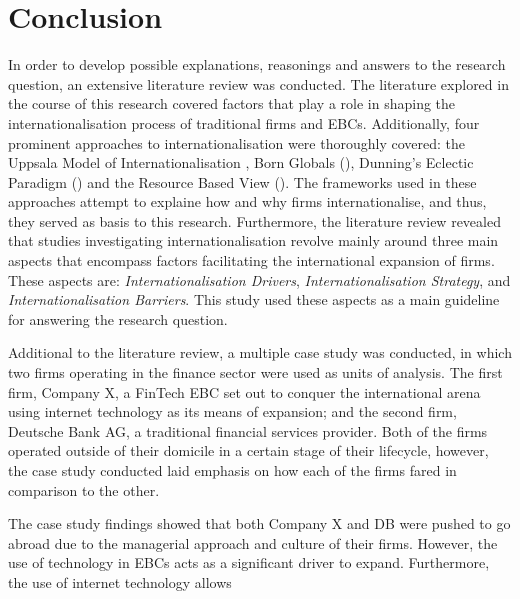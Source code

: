 \documentclass[11pt,a4paper]{article}
\begin{document}
{{{\section{Conclusion}
\label{conclusion}
\vspace{-1mm}
  \par
In order to develop possible explanations, reasonings and answers to the research question, an extensive literature review was conducted. The literature explored in the course of this research covered factors that play a role in shaping the internationalisation process of traditional firms and EBCs. Additionally, four prominent approaches to internationalisation were thoroughly covered: the Uppsala Model of Internationalisation \parencite{johansonInternationalizationProcessFirm1977}, Born Globals (\cite{rennieGlobalCompetitivenessBorn1993}), Dunning's Eclectic Paradigm (\cite{dunningEclecticTheoryInternational1980}) and the Resource Based View (\cite{barneyFirmResourcesSustained1991}). The frameworks used in these approaches attempt to explaine how and why firms internationalise, and thus, they served as basis to this research. Furthermore, the literature review revealed that studies investigating internationalisation revolve mainly around three main aspects that encompass factors facilitating the international expansion of firms. These aspects are: \textit{Internationalisation Drivers}, \textit{Internationalisation Strategy}, and \textit{Internationalisation Barriers}. This study used these aspects as a main guideline for answering the research question.  \par
Additional to the literature review, a multiple case study was conducted, in which two firms operating in the finance sector were used as units of analysis. The first firm, Company X, a FinTech EBC set out to conquer the international arena using internet technology as its means of expansion; and the second firm, Deutsche Bank AG, a traditional financial services provider. Both of the firms operated outside of their domicile in a certain stage of their lifecycle, however, the case study conducted laid emphasis on how each of the firms fared in comparison to the other. \par
The case study findings showed that both Company X and DB were pushed to go abroad due to the managerial approach and culture of their firms. However, the use of technology in EBCs acts as a significant driver to expand. Furthermore, the use of internet technology allows \newpage

}}}
\end{document}
